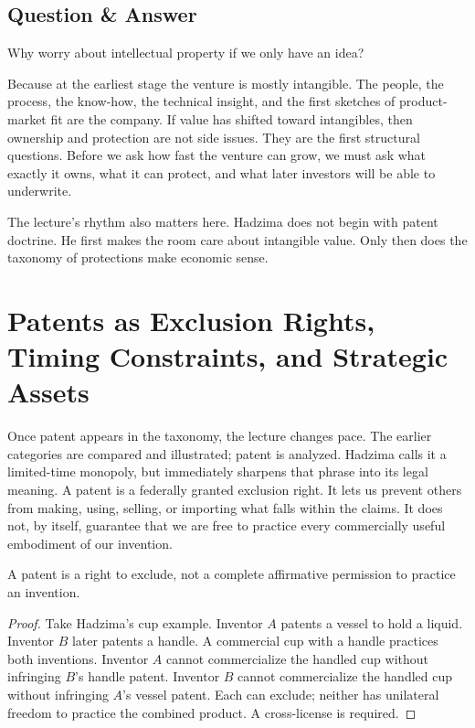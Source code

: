 \subsection{Question \& Answer}

Why worry about intellectual property if we only have an idea?

Because at the earliest stage the venture is mostly intangible. The people, the process, the know-how, the technical insight, and the first sketches of product-market fit are the company. If value has shifted toward intangibles, then ownership and protection are not side issues. They are the first structural questions. Before we ask how fast the venture can grow, we must ask what exactly it owns, what it can protect, and what later investors will be able to underwrite.

The lecture's rhythm also matters here. Hadzima does not begin with patent doctrine. He first makes the room care about intangible value. Only then does the taxonomy of protections make economic sense.

\section{Patents as Exclusion Rights, Timing Constraints, and Strategic Assets}

Once patent appears in the taxonomy, the lecture changes pace. The earlier categories are compared and illustrated; patent is analyzed. Hadzima calls it a limited-time monopoly, but immediately sharpens that phrase into its legal meaning. A patent is a federally granted exclusion right. It lets us prevent others from making, using, selling, or importing what falls within the claims. It does not, by itself, guarantee that we are free to practice every commercially useful embodiment of our invention.

\begin{proposition}
A patent is a right to exclude, not a complete affirmative permission to practice an invention.
\end{proposition}

\begin{proof}
Take Hadzima's cup example. Inventor \(A\) patents a vessel to hold a liquid. Inventor \(B\) later patents a handle. A commercial cup with a handle practices both inventions. Inventor \(A\) cannot commercialize the handled cup without infringing \(B\)'s handle patent. Inventor \(B\) cannot commercialize the handled cup without infringing \(A\)'s vessel patent. Each can exclude; neither has unilateral freedom to practice the combined product. A cross-license is required.
\end{proof}

